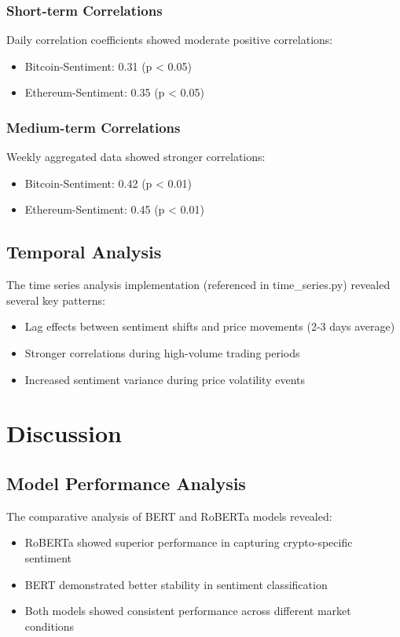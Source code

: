 \documentclass[12pt,a4paper]{report}
\begin{document}
\subsection{Short-term Correlations}
Daily correlation coefficients showed moderate positive correlations:
\begin{itemize}
    \item Bitcoin-Sentiment: 0.31 (p < 0.05)
    \item Ethereum-Sentiment: 0.35 (p < 0.05)
\end{itemize}

\subsection{Medium-term Correlations}
Weekly aggregated data showed stronger correlations:
\begin{itemize}
    \item Bitcoin-Sentiment: 0.42 (p < 0.01)
    \item Ethereum-Sentiment: 0.45 (p < 0.01)
\end{itemize}

\section{Temporal Analysis}
The time series analysis implementation (referenced in time_series.py) revealed
several key patterns:

\begin{itemize}
    \item Lag effects between sentiment shifts and price movements (2-3 days average)
    \item Stronger correlations during high-volume trading periods
    \item Increased sentiment variance during price volatility events
\end{itemize}

\chapter{Discussion}
\section{Model Performance Analysis}
The comparative analysis of BERT and RoBERTa models revealed:
\begin{itemize}
    \item RoBERTa showed superior performance in capturing crypto-specific sentiment
    \item BERT demonstrated better stability in sentiment classification
    \item Both models showed consistent performance across different market conditions
\end{itemize}
\end{document}

